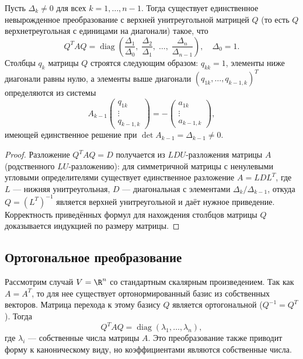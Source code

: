 \documentclass[12pt]{article}
\begin{document}
\begin{theorem}[Якоби]
Пусть $\Delta_k \neq 0$ для всех $k = 1, \dots, n-1$. Тогда существует единственное невырожденное преобразование с верхней унитреугольной матрицей $Q$ (то есть $Q$ верхнетреугольная с единицами на диагонали) такое, что
\[
Q^T A Q = \operatorname{diag}\!\left( \frac{\Delta_1}{\Delta_0},\; \frac{\Delta_2}{\Delta_1},\; \dots,\; \frac{\Delta_n}{\Delta_{n-1}} \right), \quad \Delta_0 = 1.
\]
Столбцы $q_k$ матрицы $Q$ строятся следующим образом: $q_{kk} = 1$, элементы ниже диагонали равны нулю, а элементы выше диагонали $(q_{1k}, \dots, q_{k-1,k})^T$ определяются из системы
\[
A_{k-1} \begin{pmatrix} q_{1k} \\ \vdots \\ q_{k-1,k} \end{pmatrix}
= -\begin{pmatrix} a_{1k} \\ \vdots \\ a_{k-1,k} \end{pmatrix},
\]
имеющей единственное решение при $\det A_{k-1} = \Delta_{k-1} \neq 0$.
\end{theorem}

\begin{proof}
Разложение $Q^T A Q = D$ получается из $LDU$-разложения матрицы $A$ (родственного $LU$-разложению): для симметричной матрицы с ненулевыми угловыми определителями существует единственное разложение $A = LDL^T$, где $L$ --- нижняя унитреугольная, $D$ --- диагональная с элементами $\Delta_k / \Delta_{k-1}$, откуда $Q = (L^T)^{-1}$ является верхней унитреугольной и даёт нужное приведение. Корректность приведённых формул для нахождения столбцов матрицы $Q$ доказывается индукцией по размеру матрицы.
\end{proof}

\subsection{Ортогональное преобразование}
Рассмотрим случай $V = \R^n$ со стандартным скалярным произведением. Так как $A = A^T$, то для нее существует ортонормированный базис из собственных векторов. Матрица перехода к этому базису $Q$ является ортогональной ($Q^{-1} = Q^T$). Тогда
\[
Q^T A Q = \operatorname{diag}(\lambda_1, \dots, \lambda_n),
\]
где $\lambda_i$ --- собственные числа матрицы $A$. Это преобразование также приводит форму к каноническому виду, но коэффициентами являются собственные числа.
\end{document}
